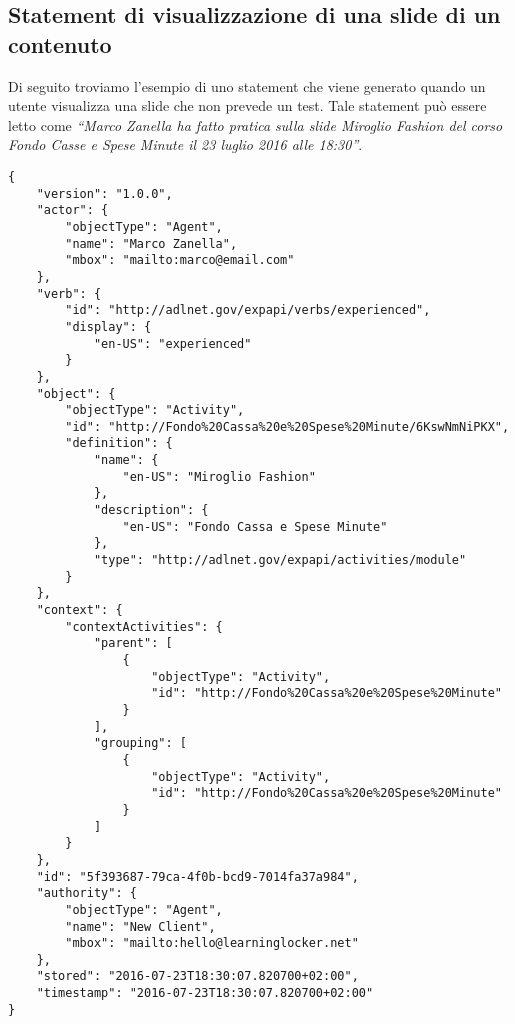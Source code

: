 	\subsection{Statement di visualizzazione di una slide di un contenuto}
    Di seguito troviamo l'esempio di uno statement che viene generato quando un utente visualizza una slide che non prevede un test. Tale statement può essere letto come \textit{``Marco Zanella ha fatto pratica sulla slide Miroglio Fashion del corso Fondo Casse e Spese Minute il 23 luglio 2016 alle 18:30''}.
\begin{lstlisting}
{
    "version": "1.0.0",
    "actor": {
        "objectType": "Agent",
        "name": "Marco Zanella",
        "mbox": "mailto:marco@email.com"
    },
    "verb": {
        "id": "http://adlnet.gov/expapi/verbs/experienced",
        "display": {
            "en-US": "experienced"
        }
    },
    "object": {
        "objectType": "Activity",
        "id": "http://Fondo%20Cassa%20e%20Spese%20Minute/6KswNmNiPKX",
        "definition": {
            "name": {
                "en-US": "Miroglio Fashion"
            },
            "description": {
                "en-US": "Fondo Cassa e Spese Minute"
            },
            "type": "http://adlnet.gov/expapi/activities/module"
        }
    },
    "context": {
        "contextActivities": {
            "parent": [
                {
                    "objectType": "Activity",
                    "id": "http://Fondo%20Cassa%20e%20Spese%20Minute"
                }
            ],
            "grouping": [
                {
                    "objectType": "Activity",
                    "id": "http://Fondo%20Cassa%20e%20Spese%20Minute"
                }
            ]
        }
    },
    "id": "5f393687-79ca-4f0b-bcd9-7014fa37a984",
    "authority": {
        "objectType": "Agent",
        "name": "New Client",
        "mbox": "mailto:hello@learninglocker.net"
    },
    "stored": "2016-07-23T18:30:07.820700+02:00",
    "timestamp": "2016-07-23T18:30:07.820700+02:00"
}
\end{lstlisting}
    
